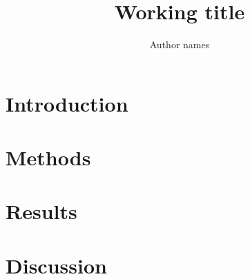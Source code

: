 \documentclass{paper}
\title{Working title}
\author{Author names}
\date{}
\begin{document}
\maketitle

\begin{abstract}

\end{abstract}

\section{Introduction}


\section{Methods}


\section{Results}


\section{Discussion}




\end{document}
